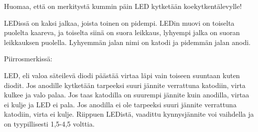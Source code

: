 \begin{tcolorbox}[title=LEDin kytkeminen,colback=blue!10,colbacktitle=purple!90]\label{box:led}
Huomaa, että on merkitystä kummin päin LED kytketään koekytkentälevylle! 

LEDissä on kaksi jalkaa, joista toinen on pidempi. LEDin muovi on toiselta puolelta kaareva, ja toiselta siinä on suora leikkaus, lyhyempi jalka on suoran leikkauksen puolella. Lyhyemmän jalan nimi on katodi ja pidemmän jalan anodi.

\begin{minipage}{0.5\textwidth}
Piirrosmerkissä:
\begin{center}
\end{center}
\end{minipage}
\begin{minipage}{0.5\textwidth}
\end{minipage}

LED, eli valoa säteilevä diodi päästää virtaa läpi vain toiseen suuntaan kuten diodit. Jos anodille kytketään tarpeeksi suuri jännite verrattuna katodiin, virta kulkee ja valo palaa. Jos taas katodilla on suurempi jännite kuin anodilla, virtaa ei kulje ja LED ei pala. Jos anodilla ei ole tarpeeksi suuri jännite verrattuna katodiin, virta ei kulje. Riippuen LEDistä, vaadittu kynnysjännite voi vaihdella ja on tyypillisesti 1,5-4,5 volttia. 
\end{tcolorbox}

